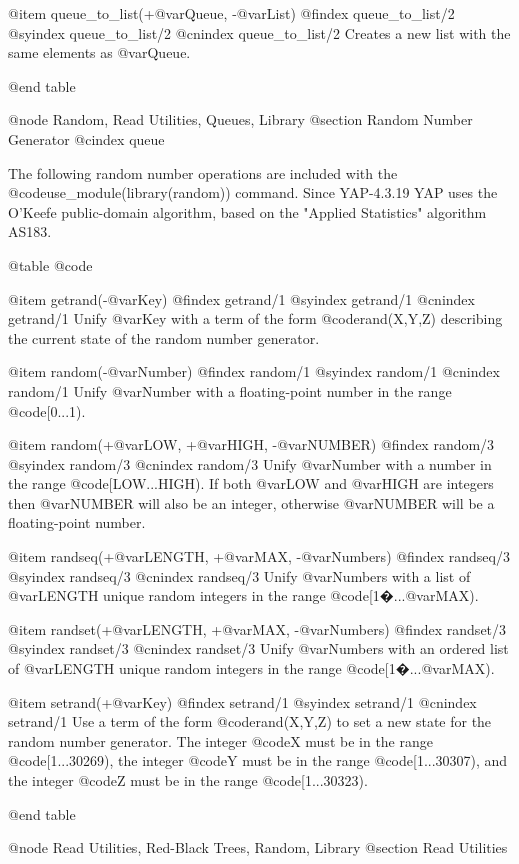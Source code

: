 {{{{{{{{{@item queue_to_list(+@var{Queue}, -@var{List})
@findex queue_to_list/2
@syindex queue_to_list/2
@cnindex queue_to_list/2
Creates a new list with the same elements as @var{Queue}.

@end table


@node Random, Read Utilities, Queues, Library
@section Random Number Generator
@cindex queue

The following random number operations are included with the
@code{use_module(library(random))} command. Since YAP-4.3.19 YAP uses
the O'Keefe public-domain algorithm, based on the "Applied Statistics"
algorithm AS183.

@table @code

@item getrand(-@var{Key})
@findex getrand/1
@syindex getrand/1
@cnindex getrand/1
Unify @var{Key} with a term of the form @code{rand(X,Y,Z)} describing the
current state of the random number generator.

@item random(-@var{Number})
@findex random/1
@syindex random/1
@cnindex random/1
Unify @var{Number} with a floating-point number in the range @code{[0...1)}.

@item random(+@var{LOW}, +@var{HIGH}, -@var{NUMBER})
@findex random/3
@syindex random/3
@cnindex random/3
Unify @var{Number} with a number in the range
@code{[LOW...HIGH)}. If both @var{LOW} and @var{HIGH} are
integers then @var{NUMBER} will also be an integer, otherwise
@var{NUMBER} will be a floating-point number.

@item randseq(+@var{LENGTH}, +@var{MAX}, -@var{Numbers})
@findex randseq/3
@syindex randseq/3
@cnindex randseq/3
Unify @var{Numbers} with a list of @var{LENGTH} unique random integers
in the range @code{[1�...@var{MAX})}.

@item randset(+@var{LENGTH}, +@var{MAX}, -@var{Numbers})
@findex randset/3
@syindex randset/3
@cnindex randset/3
Unify @var{Numbers} with an ordered list of @var{LENGTH} unique random
integers in the range @code{[1�...@var{MAX})}.

@item setrand(+@var{Key})
@findex setrand/1
@syindex setrand/1
@cnindex setrand/1
Use a term of the form @code{rand(X,Y,Z)} to set a new state for the
random number generator. The integer @code{X} must be in the range
@code{[1...30269)}, the integer @code{Y} must be in the range
@code{[1...30307)}, and the integer @code{Z} must be in the range
@code{[1...30323)}.

@end table

@node Read Utilities, Red-Black Trees, Random, Library
@section Read Utilities

}}}}}}}}}
